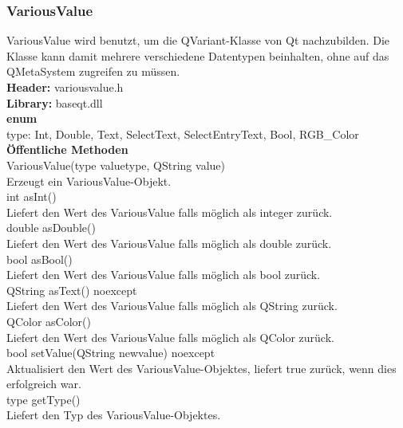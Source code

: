 \subsubsection{VariousValue}
VariousValue wird benutzt, um die QVariant-Klasse von Qt nachzubilden. Die Klasse kann damit mehrere verschiedene Datentypen beinhalten, ohne auf das QMetaSystem zugreifen zu müssen.\bigskip \\
\textbf{Header:} variousvalue.h\bigskip \\
\textbf{Library:} baseqt.dll\bigskip \\
\textbf{enum}\\
type: Int, Double, Text, SelectText, SelectEntryText, Bool, RGB\_Color\bigskip \\
\textbf{Öffentliche Methoden}\\
\small{VariousValue(type valuetype, QString value)}\\
Erzeugt ein VariousValue-Objekt.\bigskip \\
\small{int asInt()}\\
Liefert den Wert des VariousValue falls möglich als integer zurück.\bigskip \\
\small{double asDouble()}\\
Liefert den Wert des VariousValue falls möglich als double zurück.\bigskip \\
\small{bool asBool()}\\
Liefert den Wert des VariousValue falls möglich als bool zurück.\bigskip \\
\small{QString asText() noexcept}\\
Liefert den Wert des VariousValue falls möglich als QString zurück.\bigskip \\
\small{QColor asColor()}\\
Liefert den Wert des VariousValue falls möglich als QColor zurück.\bigskip \\
\small{bool setValue(QString newvalue) noexcept}\\
Aktualisiert den Wert des VariousValue-Objektes, liefert true zurück, wenn dies erfolgreich war.\bigskip \\
\small{type getType()}\\
Liefert den Typ des VariousValue-Objektes.

